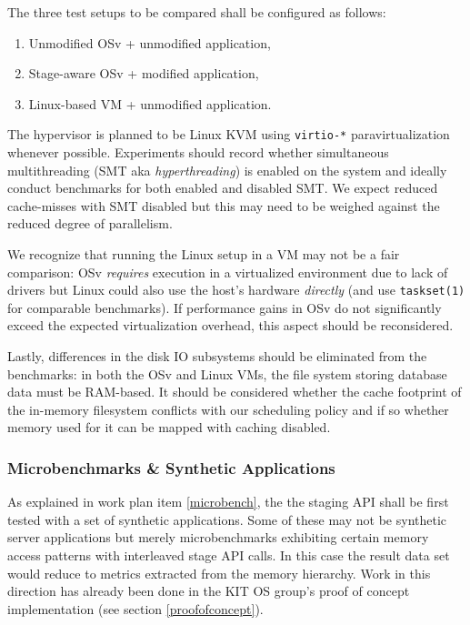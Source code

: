 \documentclass{article}
\begin{document}
The three test setups to be compared shall be configured as follows:
\begin{enumerate}
    \item Unmodified OSv + unmodified application,
    \item Stage-aware OSv + modified application,
    \item \label{linuxvmsetup} Linux-based VM + unmodified application.
\end{enumerate}
The hypervisor is planned to be Linux KVM using \texttt{virtio-*} paravirtualization whenever possible.
Experiments should record whether simultaneous multithreading (SMT aka \textit{hyperthreading}) is enabled on the system
and ideally conduct benchmarks for both enabled and disabled SMT.
We expect reduced cache-misses with SMT disabled but this may need to be weighed against the reduced degree of parallelism.

We recognize that running the Linux setup in a VM may not be a fair comparison:
OSv \emph{requires} execution in a virtualized environment due to lack of drivers
but Linux could also use the host's hardware \emph{directly} (and use \texttt{taskset(1)} for comparable benchmarks).
If performance gains in OSv do not significantly exceed the expected virtualization overhead, this aspect should be reconsidered.

Lastly, differences in the disk IO subsystems should be eliminated from the benchmarks:
in both the OSv and Linux VMs, the file system storing database data must be RAM-based.
It should be considered whether the cache footprint of the in-memory filesystem conflicts with our scheduling policy
and if so whether memory used for it can be mapped with caching disabled.

\subsubsection{Microbenchmarks \& Synthetic Applications}

As explained in work plan item \ref{microbench}, the the staging API shall be first tested with a set of synthetic
applications.
Some of these may not be synthetic server applications but merely microbenchmarks exhibiting certain memory access patterns
with interleaved stage API calls.
In this case the result data set would reduce to metrics extracted from the memory hierarchy.
Work in this direction has already been done in the KIT OS group's proof of concept implementation
(see section \ref{proofofconcept}).
\end{document}
